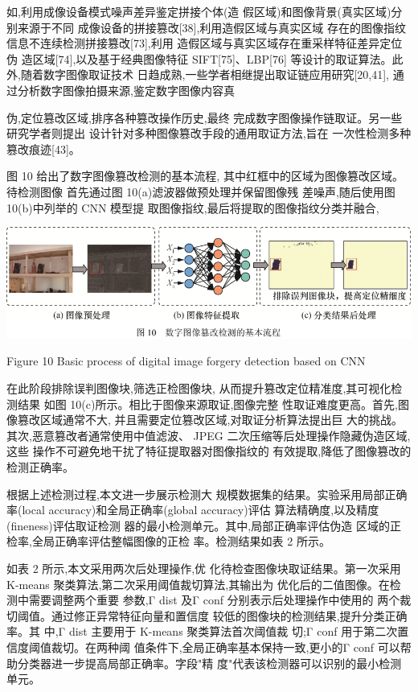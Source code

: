 \documentclass{article}
\begin{document}
如,利用成像设备模式噪声差异鉴定拼接个体(造 假区域)和图像背景(真实区域)分别来源于不同 成像设备的拼接篡改[38],利用造假区域与真实区域 存在的图像指纹信息不连续检测拼接篡改[73],利用 造假区域与真实区域存在重采样特征差异定位伪 造区域[74],以及基于经典图像特征 SIFT[75]、LBP[76] 等设计的取证算法。此外,随着数字图像取证技术 日趋成熟,一些学者相继提出取证链应用研究[20,41], 通过分析数字图像拍摄来源,鉴定数字图像内容真

伪,定位篡改区域,排序各种篡改操作历史,最终 完成数字图像操作链取证。另一些研究学者则提出 设计针对多种图像篡改手段的通用取证方法,旨在 一次性检测多种篡改痕迹[43]。

图 10 给出了数字图像篡改检测的基本流程, 其中红框中的区域为图像篡改区域。待检测图像 首先通过图 10(a)滤波器做预处理并保留图像残 差噪声,随后使用图 10(b)中列举的 CNN 模型提 取图像指纹,最后将提取的图像指纹分类并融合,


\includegraphics{_page_10_Figure_6.png}


Figure 10 Basic process of digital image forgery detection based on CNN

在此阶段排除误判图像块,筛选正检图像块, 从而提升篡改定位精准度,其可视化检测结果 如图 10(c)所示。相比于图像来源取证,图像完整 性取证难度更高。首先,图像篡改区域通常不大, 并且需要定位篡改区域,对取证分析算法提出巨 大的挑战。其次,恶意篡改者通常使用中值滤波、 JPEG 二次压缩等后处理操作隐藏伪造区域,这些 操作不可避免地干扰了特征提取器对图像指纹的 有效提取,降低了图像篡改的检测正确率。

根据上述检测过程,本文进一步展示检测大 规模数据集的结果。实验采用局部正确率(local accuracy)和全局正确率(global accuracy)评估 算法精确度,以及精度(fineness)评估取证检测 器的最小检测单元。其中,局部正确率评估伪造 区域的正检率,全局正确率评估整幅图像的正检 率。检测结果如表 2 所示。

如表 2 所示,本文采用两次后处理操作,优 化待检查图像块取证结果。第一次采用 K-means 聚类算法,第二次采用阈值裁切算法,其输出为 优化后的二值图像。在检测中需要调整两个重要 参数,Γ dist 及Γ conf 分别表示后处理操作中使用的 两个裁切阈值。通过修正异常特征向量和置信度 较低的图像块的检测结果,提升分类正确率。其 中,Γ dist 主要用于 K-means 聚类算法首次阈值裁 切;Γ conf 用于第二次置信度阈值裁切。在两种阈 值条件下,全局正确率基本保持一致,更小的Γ conf 可以帮助分类器进一步提高局部正确率。字段"精 度"代表该检测器可以识别的最小检测单元。
\end{document}

